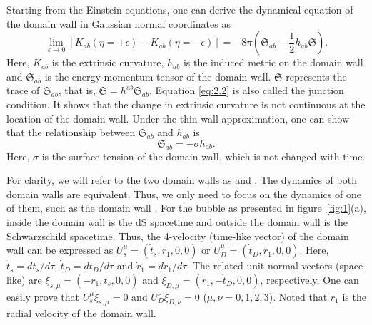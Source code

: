 \documentclass[12pt]{article}
\begin{document}
Starting from the Einstein equations, one can derive the dynamical equation of the domain wall in Gaussian normal coordinates as~\cite{SEA}
\begin{equation}
\label{eq:2.2}%
\lim_{\varepsilon\rightarrow 0}[K_{ab}(\eta=+\epsilon)-K_{ab}(\eta=-\epsilon)]=-8\pi(\mathfrak{S}_{ab}-\frac{1}{2}h_{ab}\mathfrak{S}).
\end{equation}
Here, $K_{ab}$ is the extrinsic curvature,  $h_{ab}$ is the induced metric on the domain wall and $\mathfrak{S}_{ab}$ is the  energy momentum tensor of the domain wall. $\mathfrak{S}$ represents the trace of $\mathfrak{S}_{ab}$, that is, $\mathfrak{S}=h^{ab}\mathfrak{S}_{ab}$. Equation \eqref{eq:2.2} is also called the junction condition. It shows that the change in extrinsic curvature is not continuous at the location of the domain wall. Under the thin wall approximation, one can show that the relationship between $\mathfrak{S}_{ab}$ and $h_{ab}$ is~\cite{SEA}
\begin{equation}
\label{eq:2.3}%
\mathfrak{S}_{ab}=-\sigma h_{ab}.
\end{equation}
Here, $\sigma$ is the surface tension of the domain wall, which is not changed with time.

For clarity, we will refer to the two domain walls as \uppercase\expandafter{} and \uppercase\expandafter{}. The dynamics of both domain walls are equivalent. Thus, we only need to focus on the dynamics of one of them, such as the domain wall \uppercase\expandafter{}. For the bubble as presented in figure~\ref{fig:1}(a), inside the domain wall \uppercase\expandafter{} is the dS spacetime and outside the domain wall \uppercase\expandafter{} is the Schwarzschild spacetime. Thus, the 4-velocity (time-like vector) of the domain wall can be expressed as $U_{s}^{\mu}=(\dot{t}_{s}, \dot{r}_{1}, 0, 0)$ or $U_{D}^{\mu}=(\dot{t}_{D}, \dot{r}_{1}, 0, 0)$. Here, $\dot{t}_{s}=dt_{s}/d\tau$, $\dot{t}_{D}=dt_{D}/d\tau$ and $\dot{r}_{1}=dr_{1}/d\tau$.  The related unit normal vectors (space-like) are $\xi_{ s,  \mu}=(-\dot{r}_{1}, \dot{t}_{s}, 0, 0)$ and $\xi_{ D,  \mu}=(\dot{r}_{1}, -\dot{t}_{D}, 0, 0)$, respectively. One can easily prove that $U_{s}^{\mu}\xi_{ s,  \mu}=0$ and $U_{D}^{\nu}\xi_{ D,  \nu}=0$ ($\mu, \nu=0, 1, 2, 3$). Noted that $\dot{r}_{1}$ is the radial velocity of the domain wall.
\end{document}
